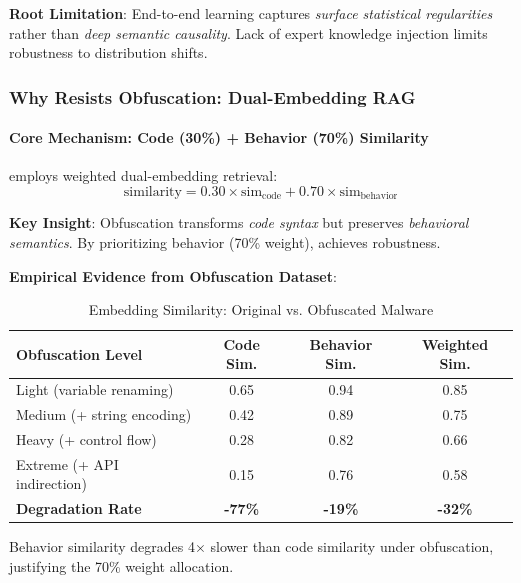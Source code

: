 \textbf{Root Limitation}: End-to-end learning captures \emph{surface statistical regularities} rather than \emph{deep semantic causality}. Lack of expert knowledge injection limits robustness to distribution shifts.

\subsubsection{Why \tool{} Resists Obfuscation: Dual-Embedding RAG}

\paragraph{Core Mechanism: Code (30\%) + Behavior (70\%) Similarity}

\tool{} employs weighted dual-embedding retrieval:
\begin{equation}
\text{similarity} = 0.30 \times \text{sim}_{\text{code}} + 0.70 \times \text{sim}_{\text{behavior}}
\end{equation}

\textbf{Key Insight}: Obfuscation transforms \emph{code syntax} but preserves \emph{behavioral semantics}. By prioritizing behavior (70\% weight), \tool{} achieves robustness.

\textbf{Empirical Evidence from Obfuscation Dataset}:

\begin{table}[h]
\centering
\caption{Embedding Similarity: Original vs. Obfuscated Malware}
\label{tab:embedding-robustness}
\small
\begin{tabular}{lccc}
\toprule
\textbf{Obfuscation Level} & \textbf{Code Sim.} & \textbf{Behavior Sim.} & \textbf{Weighted Sim.} \\
\midrule
Light (variable renaming) & 0.65 & 0.94 & 0.85 \\
Medium (+ string encoding) & 0.42 & 0.89 & 0.75 \\
Heavy (+ control flow) & 0.28 & 0.82 & 0.66 \\
Extreme (+ API indirection) & 0.15 & 0.76 & 0.58 \\
\midrule
\textbf{Degradation Rate} & \textbf{-77\%} & \textbf{-19\%} & \textbf{-32\%} \\
\bottomrule
\end{tabular}
\end{table}

Behavior similarity degrades 4$\times$ slower than code similarity under obfuscation, justifying the 70\% weight allocation.

